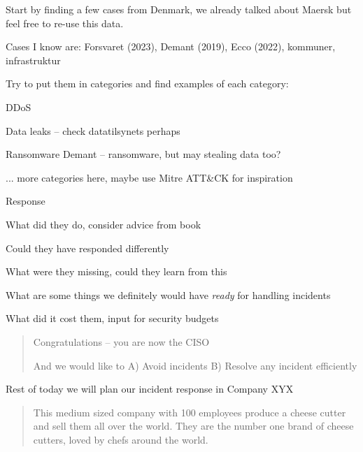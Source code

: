 \documentclass[Screen16to9,17pt]{foils}
\begin{document}

Start by finding a few cases from Denmark, we already talked about Maersk but feel free to re-use this data.

Cases I know are: Forsvaret (2023), Demant (2019), Ecco (2022), kommuner, infrastruktur

Try to put them in categories and find examples of each category:
\begin{list2}
\item DDoS
\item Data leaks -- check datatilsynets perhaps
\item Ransomware Demant -- ransomware, but may stealing data too?
\item ... more categories here, maybe use Mitre ATT\&CK for inspiration
\end{list2}

Response
\begin{list2}
\item What did they do, consider advice from book
\item Could they have responded differently
\item What were they missing, could they learn from this
\item What are some things we definitely would have \emph{ready} for handling incidents
\item What did it cost them, input for security budgets
\end{list2}




\begin{quote}
Congratulations -- you are now the CISO

And we would like to A) Avoid incidents B) Resolve any incident efficiently
\end{quote}

\begin{list2}
\item Rest of today we will plan our incident response in Company XYX
\end{list2}



\begin{quote}
This medium sized company with 100 employees produce a cheese cutter and sell them all over the world. They are the number one brand of cheese cutters, loved by chefs around the world.
\end{quote}
\end{document}
